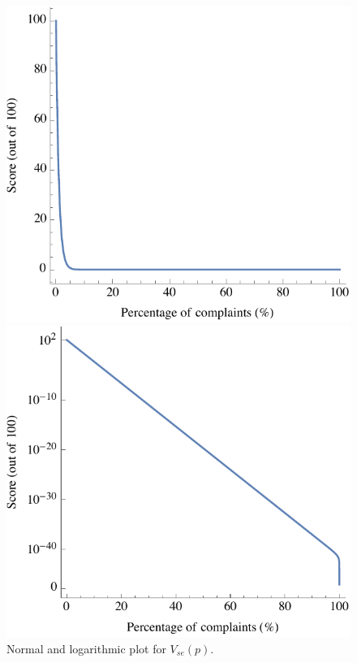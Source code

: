 \documentclass{article}
\begin{document}
\begin{figure}[htbp]
    \centering
    \begin{minipage}[t]{0.5\textwidth}
        \centering
        \includegraphics[scale=0.69]{service_plot.pdf}
    \end{minipage}
    \begin{minipage}[t]{0.4\textwidth}
        \centering
        \includegraphics[scale=0.69]{log_service_plot.pdf}
    \end{minipage}
    \caption{Normal and logarithmic plot for $V_{se}\left(p\right).$}
    \label{fig:service_plot}
\end{figure}
\end{document}
